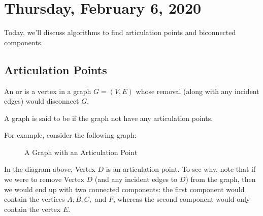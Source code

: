 \newpage
\section{Thursday, February 6, 2020}

Today, we'll discuss algorithms to find articulation points and biconnected components. 

\subsection{Articulation Points}

\begin{definition}
An  or  is a vertex in a graph $G = (V, E)$ whose removal (along with any incident edges) would disconnect $G$. 
\end{definition}

\begin{definition}
A graph is said to be  if the graph not have any articulation points. 
\end{definition}

For example, consider the following graph:

\begin{figure}[h]
\centering
{}
\caption{A Graph with an Articulation Point}
\end{figure}

In the diagram above, Vertex $D$ is an articulation point. To see why, note that if we were to remove Vertex $D$ (and any incident edges to $D$) from the graph, then we would end up with two connected components: the first component would contain the vertices $A, B, C,$ and $F$, whereas the second component would only contain the vertex $E$. \\

